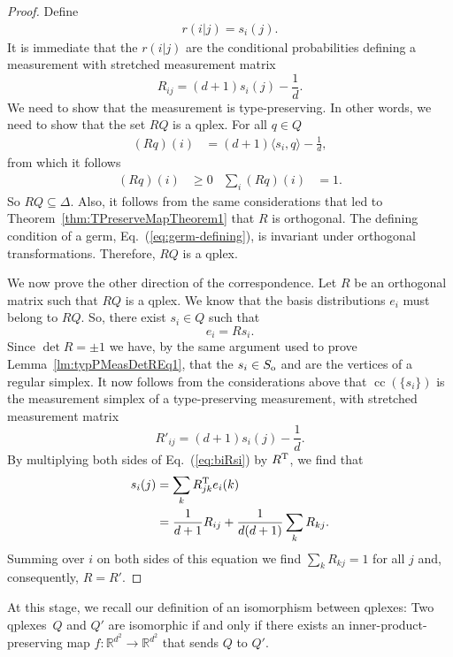 \documentclass[aps,pra,superscriptaddress,10pt,tightenlines,twocolumn,nofootinbib]{revtex4}
\theoremstyle{remark}
\newcommand{\be}{\begin{equation}}
\newcommand{\ee}{\end{equation}}
\newcommand{\ea}[1]{\begin{align}#1\end{align}}
\newcommand{\fd}[1]{\mathbb{#1}}
\newcommand{\la}{\langle}
\newcommand{\ra}{\rangle}
\newcommand{\ps}{\Delta}
\newcommand{\so}{S_{\rm{o}}}
\newcommand{\qp}{Q}
\newcommand{\qplexes}{qplexes}
\DeclareMathOperator{\cc}{cc}
\begin{document}
\begin{proof}
Define
\ea{
r(i|j) = s_i(j).
}
It is immediate that the $r(i|j)$ are the conditional probabilities defining a measurement with stretched measurement matrix
\be
R_{ij} = (d+1)s_i(j) -\frac{1}{d}.
\ee
We need to show that the measurement is type-preserving.  In other words, we need to show that the set $R\qp$ is a qplex.  For all $q\in \qp$
\ea{
(Rq)(i) &= (d+1) \la s_i , q\ra - \frac{1}{d},
}
from which it follows
\ea{
(Rq)(i) &\ge 0 & \sum_i (R q)(i) &= 1.
}
So $R\qp\subseteq \ps$.  Also,
it follows from the same considerations that led to Theorem~\ref{thm:TPreserveMapTheorem1} that $R$ is orthogonal.  The defining condition of a germ, Eq.~(\ref{eq:germ-defining}), is invariant under orthogonal transformations.  Therefore, $R\qp$ is a qplex.

We now prove the other direction of the correspondence.  Let $R$ be an orthogonal matrix such that $R\qp$ is a qplex.  We know that the basis distributions $e_i$ must belong to $R\qp$.  So, there exist $s_i\in \qp$ such that
\be
e_i = Rs_i.
\label{eq:biRsi}
\ee
Since $\det R = \pm 1$ we have, by the same argument used to prove Lemma~\ref{lm:typPMeasDetREq1}, that the $s_i\in \so$ and are the vertices of a regular simplex.  It now follows from the considerations above that $\cc(\{ s_i\})$ is the measurement simplex of a type-preserving measurement, with stretched measurement matrix
\be
R'_{ij} = (d+1) s_i(j) -\frac{1}{d}.
\ee
By multiplying both sides of Eq.~(\ref{eq:biRsi}) by $R^{\rm T}$, we find that
\ea{
s_i(j) &= \sum_k R^{\rm{T}}_{jk} e_i(k)
\nonumber
\\
&=\frac{1}{d+1} R_{ij} + \frac{1}{d(d+1)} \sum_{k} R_{kj}.
\label{eq:MeasMatTermsSimpCalc}
}
Summing over $i$ on both sides of this equation we find
$
\sum_k R_{kj} = 1
$
for all $j$ and, consequently, $R=R'$.
\end{proof}

At this stage, we recall our definition of an isomorphism between
qplexes: Two \qplexes\ $\qp$ and $\qp'$ are isomorphic if and only if
there exists an inner-product-preserving map $f\colon \fd{R}^{d^2} \to
\fd{R}^{d^2}$ that sends $\qp$ to $\qp'$.
\end{document}
